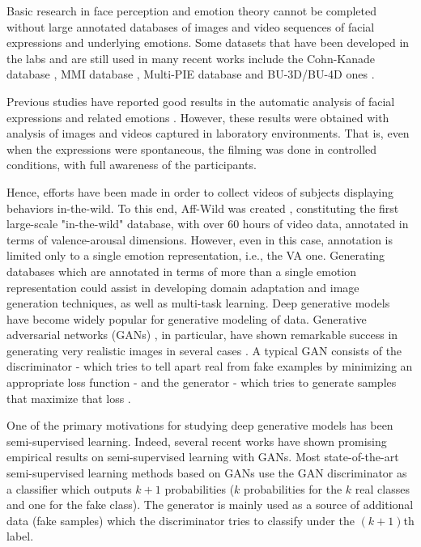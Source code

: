 \documentclass[a4paper, 10pt, conference]{ieeeconf}      %
\begin{document}
Basic research in face perception and emotion theory cannot be completed without large annotated databases of
images and video sequences of facial expressions and underlying emotions.
Some datasets that have been developed in the labs and are still used in many recent works include the Cohn-Kanade database \cite{tian2001recognizing}\cite{lucey2010extended}, MMI database  \cite{pantic2005web}\cite{valstar2010induced}, Multi-PIE database \cite{gross2010multi} and BU-3D/BU-4D ones \cite{yin20063d}\cite{yin2008high}. 

Previous studies have reported good results in the automatic analysis of facial expressions and related
emotions \cite{corneanu2016survey}. However, these results were obtained with
analysis of images and videos captured in laboratory environments. That is, even when the expressions were spontaneous,
the filming was done in controlled conditions, with full awareness of the participants.

Hence, efforts have been made in order to collect videos of subjects displaying behaviors in-the-wild. To this end, Aff-Wild was created \cite{zafeiriou2017aff}, constituting the first large-scale "in-the-wild" database, with over 60 hours of video data, annotated in terms of valence-arousal dimensions. However, even in this case,  annotation is limited only to a single emotion representation, i.e., the VA one. Generating databases which are annotated in terms of more than a single  emotion representation could assist in developing domain adaptation and image generation techniques, as well as multi-task learning.
Deep generative models have become widely popular for generative modeling of data. Generative adversarial networks (GANs) \cite{goodfellow2014generative}, in particular, have shown remarkable success in generating very realistic images in several cases \cite{radford2015unsupervised}\cite{berthelot2017began}. A typical GAN consists of the discriminator - which tries to tell apart real from fake examples by minimizing an appropriate loss function - and the generator - which tries to generate samples that maximize that loss \cite{tu2007learning}.

One of the primary motivations for studying deep generative models has been semi-supervised learning.
Indeed, several recent works have shown promising empirical results on semi-supervised learning with GANs. Most state-of-the-art semi-supervised learning methods based on GANs  \cite{salimans2016improved} use the GAN discriminator as a classifier which outputs $k+1$ probabilities ($k$ probabilities for the $k$ real classes and one for the fake class). The generator is mainly used as a source of additional data (fake samples) which the discriminator tries to classify under the $(k+1)$th label.
\end{document}
